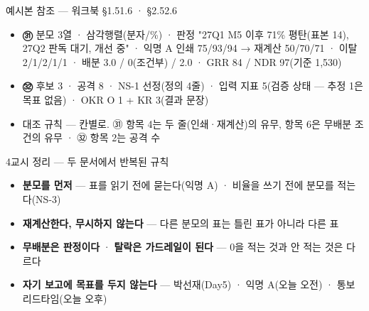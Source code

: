 \begin{frame}{예시본 참조 — 워크북 §1.5\til{}1.6 · §2.5\til{}2.6}
\begin{itemize}
\item \textbf{㉛} 분모 3열 · 삼각행렬(분자/\%) · 판정 "27Q1 M5 이후 71\% 평탄(표본 14), 27Q2 판독 대기, 개선 중" · 익명 A 인쇄 75/93/94 → 재계산 50/70/71 · 이탈 2/1/2/1/1 · 배분 3.0 / 0(조건부) / 2.0 · GRR 84 / NDR 97(기준 1,530)
\item \textbf{㉜} 후보 3 · 공격 8 · NS-1 선정(정의 4줄) · 입력 지표 5(검증 상태 — 추정 1은 목표 없음) · OKR O 1 + KR 3(결과 문장)
\item 대조 규칙 — 칸별로. ㉛ 항목 4는 두 줄(인쇄·재계산)의 유무, 항목 6은 무배분 조건의 유무 · ㉜ 항목 2는 공격 수
\end{itemize}
\end{frame}

\begin{frame}{4교시 정리 — 두 문서에서 반복된 규칙}
\begin{itemize}
\item \textbf{분모를 먼저} — 표를 읽기 전에 묻는다(익명 A) · 비율을 쓰기 전에 분모를 적는다(NS-3)
\item \textbf{재계산한다, 무시하지 않는다} — 다른 분모의 표는 틀린 표가 아니라 다른 표
\item \textbf{무배분은 판정이다} · \textbf{탈락은 가드레일이 된다} — 0을 적는 것과 안 적는 것은 다르다
\item \textbf{자기 보고에 목표를 두지 않는다} — 박선재(Day5) · 익명 A(오늘 오전) · 통보 리드타임(오늘 오후)
\end{itemize}
\end{frame}

